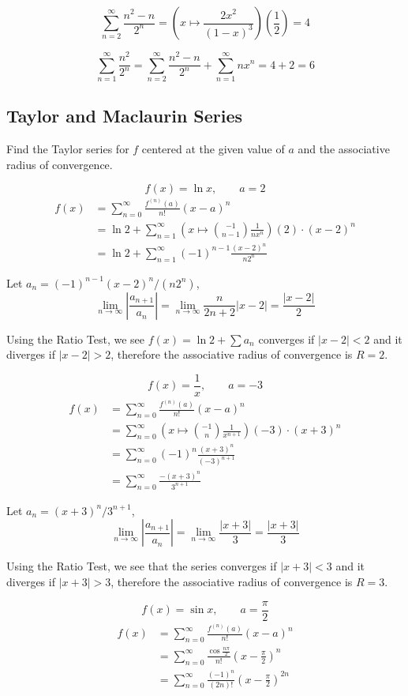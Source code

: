 \documentclass[a4paper,12pt]{article}
\begin{document}
\[\sum_{n=2}^\infty \frac{n^2 - n}{2^n}
= \left(x \mapsto \frac{2x^2}{(1 - x)^3}\right)\left(\frac{1}{2}\right)
= 4\tag{c.ii}\]

\[\sum_{n=1}^\infty \frac{n^2}{2^n}
= \sum_{n=2}^\infty \frac{n^2 - n}{2^n} + \sum_{n=1}^\infty nx^n
= 4 + 2 = 6\tag{c.iii}\]

\subsection{Taylor and Maclaurin Series}
Find the Taylor series for $f$ centered at the given value of $a$ and the
associative radius of convergence.

\[f(x) = \ln x,\qquad a = 2\tag{15}\]
\begin{align*}
   f(x)
&= \sum_{n=0}^\infty\frac{f^{(n)}(a)}{n!}(x - a)^n\\
&= \ln 2 + \sum_{n=1}^\infty\left(x\mapsto\binom{-1}{n-1}\frac{1}{nx^n}\right)
                            (2)\cdot(x - 2)^n\\
  &= \ln 2 + \sum_{n=1}^\infty(-1)^{n-1}\frac{(x - 2)^n}{n2^n}
\end{align*}

Let $a_n = (-1)^{n-1}(x - 2)^n/(n2^n)$,
\[\lim_{n\to\infty}\left|\frac{a_{n+1}}{a_n}\right|
= \lim_{n\to\infty}\frac{n}{2n + 2}|x - 2|
= \frac{|x - 2|}{2}\]

Using the Ratio Test, we see $f(x) = \ln 2 + \sum a_n$ converges if
$|x - 2| < 2$ and it diverges if $|x - 2| > 2$, therefore the associative
radius of convergence is $R = 2$.

\[f(x) = \frac{1}{x},\qquad a = -3\tag{16}\]
\begin{align*}
   f(x)
&= \sum_{n=0}^\infty\frac{f^{(n)}(a)}{n!}(x - a)^n\\
&= \sum_{n=0}^\infty
   \left(x\mapsto\binom{-1}{n}\frac{1}{x^{n+1}}\right)(-3)\cdot(x + 3)^n\\
&= \sum_{n=0}^\infty(-1)^n\frac{(x + 3)^n}{(-3)^{n+1}}\\
&= \sum_{n=0}^\infty\frac{-(x + 3)^n}{3^{n+1}}
\end{align*}

Let $a_n = (x + 3)^n/3^{n+1}$,
\[\lim_{n\to\infty}\left|\frac{a_{n+1}}{a_n}\right|
= \lim_{n\to\infty}\frac{|x + 3|}{3}
= \frac{|x + 3|}{3}\]

Using the Ratio Test, we see that the series converges if $|x + 3| < 3$ and it
diverges if $|x + 3| > 3$, therefore the associative radius of convergence is
$R = 3$.

\[f(x) = \sin x,\qquad a = \frac{\pi}{2}\tag{18}\]
\begin{align*}
f(x) &= \sum_{n=0}^\infty\frac{f^{(n)}(a)}{n!}(x - a)^n\\
     &= \sum_{n=0}^\infty\frac{\cos\frac{n\pi}{2}}{n!}
                         \left(x - \frac{\pi}{2}\right)^n\\
     &= \sum_{n=0}^\infty\frac{(-1)^n}{(2n)!}
                         \left(x - \frac{\pi}{2}\right)^{2n}
\end{align*}
\end{document}
